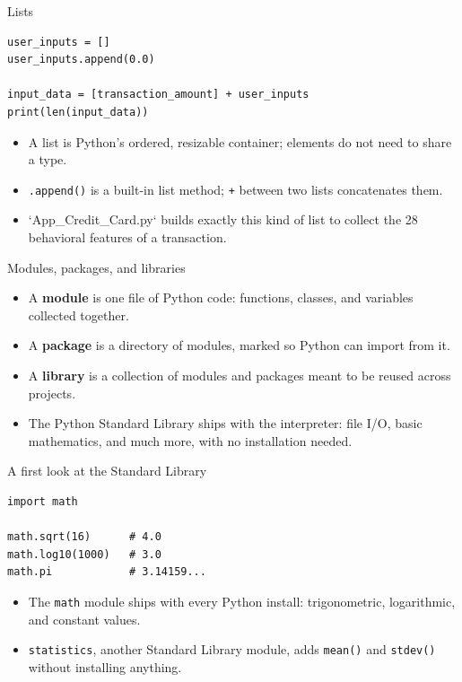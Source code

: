 \begin{frame}[fragile]{Lists}
\begin{lstlisting}[style=coursepython]
user_inputs = []
user_inputs.append(0.0)

input_data = [transaction_amount] + user_inputs
print(len(input_data))
\end{lstlisting}
\begin{itemize}
\item A list is Python's ordered, resizable container; elements do not need to share a type.
\item \texttt{.append()} is a built-in list method; \texttt{+} between two lists concatenates them.
\item `App\_Credit\_Card.py` builds exactly this kind of list to collect the 28 behavioral features of a transaction.
\end{itemize}
\coursefooter
\end{frame}

\begin{frame}{Modules, packages, and libraries}
\begin{itemize}
\item A \textbf{module} is one file of Python code: functions, classes, and variables collected together.
\item A \textbf{package} is a directory of modules, marked so Python can import from it.
\item A \textbf{library} is a collection of modules and packages meant to be reused across projects.
\item The Python Standard Library ships with the interpreter: file I/O, basic mathematics, and much more, with no installation needed.
\end{itemize}
\coursefooter
\end{frame}

\begin{frame}[fragile]{A first look at the Standard Library}
\begin{lstlisting}[style=coursepython]
import math

math.sqrt(16)      # 4.0
math.log10(1000)   # 3.0
math.pi            # 3.14159...
\end{lstlisting}
\begin{itemize}
\item The \texttt{math} module ships with every Python install: trigonometric, logarithmic, and constant values.
\item \texttt{statistics}, another Standard Library module, adds \texttt{mean()} and \texttt{stdev()} without installing anything.
\end{itemize}
\coursefooter
\end{frame}

